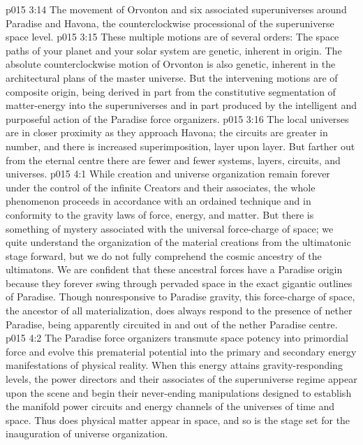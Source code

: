 \vs p015 3:14 \bibnobreakspace The movement of Orvonton and six associated superuniverses around Paradise and Havona, the counterclockwise processional of the superuniverse space level.
\vs p015 3:15 \pc These multiple motions are of several orders: The space paths of your planet and your solar system are genetic, inherent in origin. The absolute counterclockwise motion of Orvonton is also genetic, inherent in the architectural plans of the master universe. But the intervening motions are of composite origin, being derived in part from the constitutive segmentation of matter\hyp{}energy into the superuniverses and in part produced by the intelligent and purposeful action of the Paradise force organizers.
\vs p015 3:16 \pc The local universes are in closer proximity as they approach Havona; the circuits are greater in number, and there is increased superimposition, layer upon layer. But farther out from the eternal centre there are fewer and fewer systems, layers, circuits, and universes.
\vs p015 4:1 While creation and universe organization remain forever under the control of the infinite Creators and their associates, the whole phenomenon proceeds in accordance with an ordained technique and in conformity to the gravity laws of force, energy, and matter. But there is something of mystery associated with the universal force\hyp{}charge of space; we quite understand the organization of the material creations from the ultimatonic stage forward, but we do not fully comprehend the cosmic ancestry of the ultimatons. We are confident that these ancestral forces have a Paradise origin because they forever swing through pervaded space in the exact gigantic outlines of Paradise. Though nonresponsive to Paradise gravity, this force\hyp{}charge of space, the ancestor of all materialization, does always respond to the presence of nether Paradise, being apparently circuited in and out of the nether Paradise centre.
\vs p015 4:2 The Paradise force organizers transmute space potency into primordial force and evolve this prematerial potential into the primary and secondary energy manifestations of physical reality. When this energy attains gravity\hyp{}responding levels, the power directors and their associates of the superuniverse regime appear upon the scene and begin their never\hyp{}ending manipulations designed to establish the manifold power circuits and energy channels of the universes of time and space. Thus does physical matter appear in space, and so is the stage set for the inauguration of universe organization.
